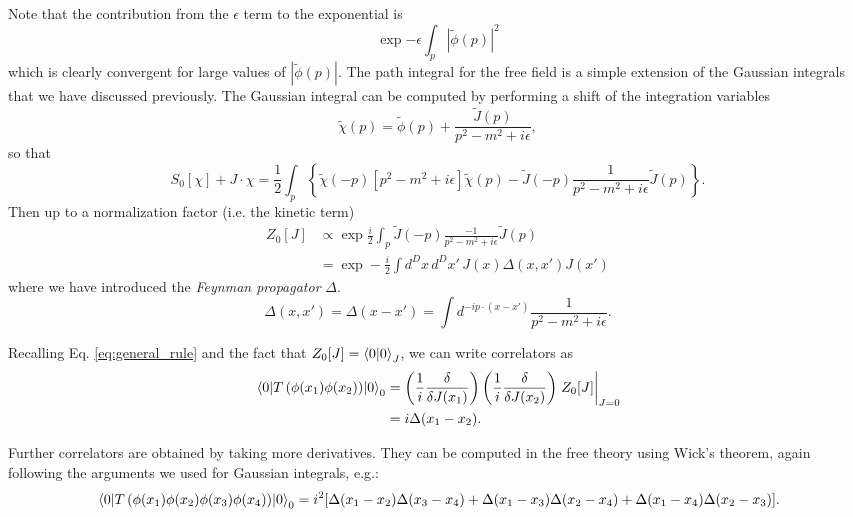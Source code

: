 \documentclass{article}
\numberwithin{equation}{section}
\begin{document}
Note that the contribution from the $\epsilon$ term to the exponential is 
\begin{equation}
    \exp{-\epsilon \int_p \left|\tilde{\phi}(p)\right|^2}
\end{equation}
which is clearly convergent for large values of $|\tilde{\phi}(p)|$. The path integral for the free field is a simple extension of the Gaussian integrals that we have discussed previously. %
The Gaussian integral can be computed by performing a shift of the integration variables
\begin{equation} \label{eq:shift_integration_variables_propagator}
    \tilde{\chi}(p) = \tilde{\phi}(p) + \frac{\tilde{J}(p)}{p^2-m^2+i\epsilon},
\end{equation}
so that 
\begin{equation}
    S_0[\chi] + J \cdot \chi = \frac{1}{2} \int_p \left\{\tilde{\chi}(-p)[p^2 - m^2 + i\epsilon]\tilde{\chi}(p) - \tilde{J}(-p) \frac{1}{p^2 - m^2 + i\epsilon} \tilde{J}(p) \right\}.
\end{equation}
Then up to a normalization factor (i.e. the kinetic term)
\begin{equation} \label{eq:z0}
\begin{aligned}
    Z_0[J] &\propto \exp \frac{i}{2} \int_p \tilde{J}(-p)\frac{-1}{p^2-m^2+i\epsilon}\tilde{J}(p) \\
    &= \exp -\frac{i}{2} \int d^Dx\, d^Dx' \, J(x) \Delta(x, x') J(x') 
\end{aligned}
\end{equation}
where we have introduced the \textit{Feynman propagator} $\Delta$.
\begin{equation}
    \Delta(x, x') = \Delta(x - x') = \int d^{-ip\cdot(x-x')} \frac{1}{p^2-m^2+i\epsilon}.
\end{equation}

Recalling Eq. \ref{eq:general_rule} and the fact that $Z_0[J] = \braket{0}{0}_J$, we can write correlators as 
\begin{equation}
\begin{aligned}
    \mel{0}{T\left(\phi(x_1) \phi(x_2)\right)}{0}_0 &= \left(\frac{1}{i}\fdv{J(x_1)}\right)\left(\frac{1}{i}\fdv{J(x_2)}\right) \eval{Z_0[J]}_{J=0} \\
    &= i\Delta(x_1 - x_2).
\end{aligned}
\end{equation}

Further correlators are obtained by taking more derivatives. They can be computed in the free theory using Wick's theorem, again following the arguments we used for Gaussian integrals, e.g.:
\begin{equation}
    \mel{0}{T\left(\phi(x_1)\phi(x_2)\phi(x_3)\phi(x_4)\right)}{0}_0 = i^2[\Delta(x_1-x_2) \Delta(x_3-x_4) + \Delta(x_1-x_3)\Delta(x_2-x_4) + \Delta(x_1-x_4)\Delta(x_2-x_3)].
\end{equation}
\end{document}
